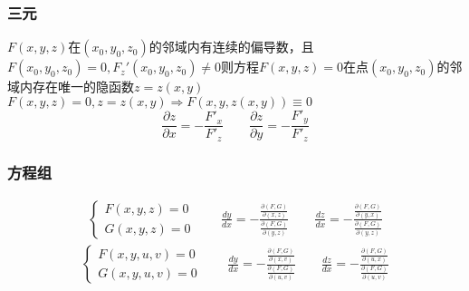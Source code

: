 \subsubsection{三元}
$F(x,y,z)$在$(x_0,y_0,z_0)$的邻域内有连续的偏导数，且$F(x_0,y_0,z_0)=0,F_z'(x_0,y_0,z_0)\neq 0$则方程$F(x,y,z)=0$在点$(x_0,y_0,z_0)$的邻域内存在唯一的隐函数$z=z(x,y)$\\
$F(x,y,z)=0,z=z(x,y)\Rightarrow F(x,y,z(x,y))\equiv0$
$$\frac{\partial z}{\partial x}=-\frac{F'_x}{F'_z}\qquad\frac{\partial z}{\partial y}=-\frac{F'_y}{F'_z}$$
\subsubsection{方程组}
\begin{align}
	\begin{cases}
		F(x,y,z)=0\\
		G(x,y,z)=0
	\end{cases}\qquad
	\frac{dy}{dx}=-\frac{\frac{\partial(F,G)}{\partial(x,z)}}{\frac{\partial(F,G)}{\partial(y,z)}}\qquad
	\frac{dz}{dx}=-\frac{\frac{\partial(F,G)}{\partial(y,x)}}{\frac{\partial(F,G)}{\partial(y,z)}}\label{Multivariate_equation_system_1}
\end{align}
\begin{align}
	\begin{cases}
		F(x,y,u,v)=0\\
		G(x,y,u,v)=0
	\end{cases}\qquad
	\frac{dy}{dx}=-\frac{\frac{\partial(F,G)}{\partial(x,v)}}{\frac{\partial(F,G)}{\partial(u,v)}}\qquad
	\frac{dz}{dx}=-\frac{\frac{\partial(F,G)}{\partial(u,x)}}{\frac{\partial(F,G)}{\partial(u,v)}}\label{Multivariate_equation_system_2}
\end{align}














